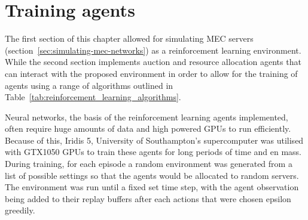 \section{Training agents}\label{sec:training-agents}
The first section of this chapter allowed for simulating MEC servers
(section~\ref{sec:simulating-mec-networks}) as a reinforcement learning environment. While the second
section implements auction and resource allocation agents that can interact with the proposed environment in order
to allow for the training of agents using a range of algorithms outlined in
Table~\ref{tab:reinforcement_learning_algorithms}.

Neural networks, the basis of the reinforcement learning agents implemented, often require huge amounts of data and
high powered GPUs to run efficiently. Because of this, Iridis 5, University of Southampton's supercomputer was utilised
with GTX1050 GPUs to train these agents for long periods of time and en mass. During training, for each episode a
random environment was generated from a list of possible settings so that the agents would be allocated to random
servers. The environment was run until a fixed set time step, with the agent observation being added to their replay
buffers after each actions that were chosen epsilon greedily.

